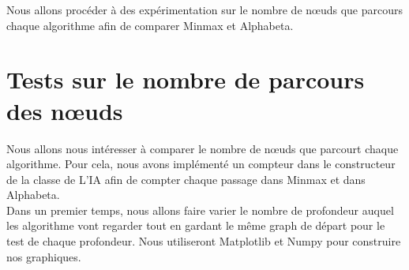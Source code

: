 \documentclass[a4paper,12pt]{article} %
\begin{document}
Nous allons procéder à des expérimentation sur le nombre de nœuds que parcours chaque algorithme afin de comparer Minmax et Alphabeta.

\section{Tests sur le nombre de parcours des nœuds}

Nous allons nous intéresser à comparer le nombre de nœuds que parcourt chaque algorithme. Pour cela, nous avons implémenté un compteur dans le constructeur de la classe de L'IA afin de compter chaque passage dans Minmax et dans Alphabeta.\\

Dans un premier temps, nous allons faire varier le nombre de profondeur auquel les algorithme vont regarder tout en gardant le même graph de départ pour le test de chaque profondeur. Nous utiliseront Matplotlib et Numpy pour construire nos graphiques.
\end{document}
